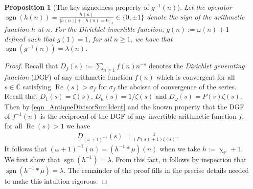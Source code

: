 \documentclass[11pt,reqno,a4letter]{article}
\numberwithin{figure}{section}
\numberwithin{table}{section}
\newcommand{\Iverson}[1]{\ensuremath{\left[#1\right]_{\delta}}}
\renewcommand{\chi}{\upchi}
\theoremstyle{plain}
\newtheorem{prop}[theorem]{Proposition}
\numberwithin{theorem}{section}
\theoremstyle{definition}
\newcommand{\NBRef}[1]{}
\renewcommand{\Re}{\operatorname{Re}}
\begin{document}
\begin{prop}[The key signedness property of $g^{-1}(n)$]
\label{prop_SignageDirInvsOfPosBddArithmeticFuncs_v1} 
Let the operator 
$\operatorname{sgn}(h(n)) = \frac{h(n)}{|h(n)| + \Iverson{h(n) = 0}} \in \{0, \pm 1\}$ denote the sign 
of the arithmetic function $h$ at $n$. 
For the Dirichlet invertible function, $g(n) := \omega(n) + 1$ defined such that $g(1) = 1$, for all 
$n \geq 1$, we have that $\operatorname{sgn}(g^{-1}(n)) = \lambda(n)$. 
\NBRef{A02-2020-04-26}
\end{prop} 
\begin{proof} 
Recall that $D_f(s) := \sum_{n \geq 1} f(n) n^{-s}$ denotes the 
\emph{Dirichlet generating function} (DGF) of any 
arithmetic function $f(n)$ which is convergent for all $s \in \mathbb{C}$ satisfying 
$\Re(s) > \sigma_f$ for $\sigma_f$ the abcissa of convergence of the series. 
Recall that $D_1(s) = \zeta(s)$, $D_{\mu}(s) = 1 / \zeta(s)$ and $D_{\omega}(s) = P(s) \zeta(s)$. 
Then by \eqref{eqn_AntiqueDivisorSumIdent} and the known property that the DGF of $f^{-1}(n)$ is 
the reciprocal of the DGF of any invertible arithmetic function $f$, for all $\Re(s) > 1$ we have 
\begin{align} 
\label{eqn_DGF_of_gInvn} 
D_{(\omega+1)^{-1}}(s) = \frac{1}{(P(s)+1) \zeta(s)}. 
\end{align} 
It follows that $(\omega + 1)^{-1}(n) = (h^{-1} \ast \mu)(n)$ when we take 
$h := \chi_{\mathbb{P}} + 1$. 
We first show that $\operatorname{sgn}(h^{-1}) = \lambda$. From this fact, it follows by inspection 
that $\operatorname{sgn}(h^{-1} \ast \mu) = \lambda$. The remainder of the proof fills in the 
precise details needed to make this intuition rigorous. 


\end{proof}
\end{document}
